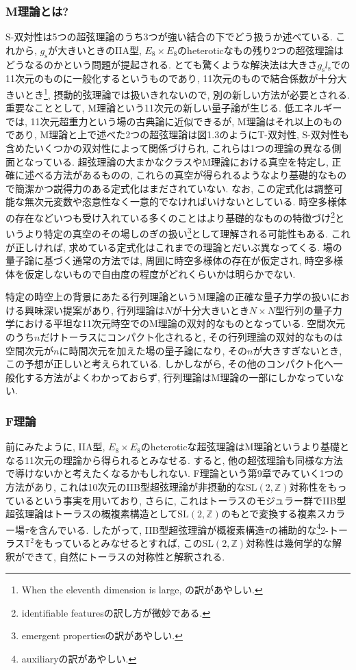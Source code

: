 \documentclass[10pt,a4paper]{jsarticle}
\begin{document}
\subsubsection*{M理論とは? }
S-双対性は5つの超弦理論のうち3つが強い結合の下でどう扱うか述べている. これから, $g_{\mathrm{s}}$が大きいときのIIA型, $E_8 \times E_8 $のheteroticなもの残り2つの超弦理論はどうなるのかという問題が提起される. とても驚くような解決法は大きさ$g_{\mathrm{s}} l_{\mathrm{s}} $での11次元のものに一般化するというものであり, 11次元のもので結合係数が十分大きいとき\footnote{When the eleventh dimension is large, の訳があやしい. }, 摂動的弦理論では扱いきれないので, 別の新しい方法が必要とされる. 重要なこととして, M理論という11次元の新しい量子論が生じる. 低エネルギーでは, 11次元超重力という場の古典論に近似できるが, M理論はそれ以上のものであり, M理論と上で述べた2つの超弦理論は図1.3のようにT-双対性, S-双対性も含めたいくつかの双対性によって関係づけられ, これらは1つの理論の異なる側面となっている. 超弦理論の大まかなクラスやM理論における真空を特定し, 正確に述べる方法があるものの, これらの真空が得られるようなより基礎的なもので簡潔かつ説得力のある定式化はまだされていない. なお, この定式化は調整可能な無次元変数や恣意性なく一意的でなければいけないとしている. 時空多様体の存在などいつも受け入れている多くのことはより基礎的なものの特徴づけ\footnote{identifiable featuresの訳し方が微妙である. }というより特定の真空のその場しのぎの扱い\footnote{emergent propertiesの訳があやしい. }として理解される可能性もある. これが正しければ, 求めている定式化はこれまでの理論とだいぶ異なってくる. 場の量子論に基づく通常の方法では, 周囲に時空多様体の存在が仮定され, 時空多様体を仮定しないもので自由度の程度がどれくらいかは明らかでない. \par
特定の時空上の背景にあたる行列理論というM理論の正確な量子力学の扱いにおける興味深い提案があり, 行列理論は$N$が十分大きいとき$N \times N$型行列の量子力学における平坦な11次元時空でのM理論の双対的なものとなっている. 空間次元のうち$n$だけトーラスにコンパクト化されると, その行列理論の双対的なものは空間次元が$n$に時間次元を加えた場の量子論になり, その$n$が大きすぎないとき, この予想が正しいと考えられている. しかしながら, その他のコンパクト化へ一般化する方法がよくわかっておらず, 行列理論はM理論の一部にしかなっていない. 
\subsubsection*{F理論}
前にみたように, IIA型, $E_8 \times E_8 $のheteroticな超弦理論はM理論というより基礎となる11次元の理論から得られるとみなせる. すると, 他の超弦理論も同様な方法で導けないかと考えたくなるかもしれない. F理論という第9章でみていく1つの方法があり, これは10次元のIIB型超弦理論が非摂動的な$\mathrm{SL} \left( 2, \mathbb{Z} \right)$対称性をもっているという事実を用いており, さらに, これはトーラスのモジュラー群でIIB型超弦理論はトーラスの概複素構造として$\mathrm{SL} \left( 2, \mathbb{Z} \right)$のもとで変換する複素スカラー場$\tau $を含んでいる. したがって, IIB型超弦理論が概複素構造$\tau $の補助的な\footnote{auxiliaryの訳があやしい. }2-トーラス$\mathbb{T}^2 $をもっているとみなせるとすれば, この$\mathrm{SL} \left( 2, \mathbb{Z} \right)$対称性は幾何学的な解釈ができて, 自然にトーラスの対称性と解釈される. 
\end{document}
